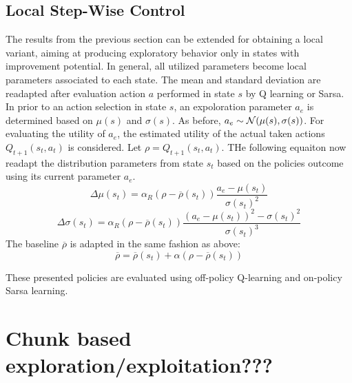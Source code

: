 \documentclass[10.5pt]{article}
\begin{document}
\subsection{Local Step-Wise Control}
The results from the previous section can be extended for obtaining a local variant, aiming at producing exploratory behavior only in states with improvement potential. In general, all utilized parameters become local parameters associated to each state. The mean and standard deviation are readapted after evaluation action $a$ performed in state $s$ by Q learning or Sarsa. In prior to an action selection in state $s$, an expoloration parameter $a_e$ is determined based on $\mu(s)$ and $\sigma(s)$. As before, $a_e\sim {\cal N}(\mu(s), \sigma(s))$. For evaluating the utility of $a_e$, the estimated utility of the actual taken actions $Q_{t+1}(s_t, a_t)$ is considered. Let $\rho = Q_{t+1}(s_t, a_t)$. THe following equaiton now readapt the distribution parameters from state $s_t$ based on the policies outcome using its current parameter $a_e$. 
\begin{equation}
\Delta\mu(s_t) = \alpha_R (\rho - \overline{\rho}(s_t)) \dfrac{a_e -\mu(s_t)}{\sigma(s_t)^2}
\end{equation} 
\begin{equation}
\Delta \sigma (s_t) = \alpha_R (\rho - \overline{\rho}(s_t))\dfrac{(a_e-\mu(s_t))^2-\sigma(s_t)^2}{\sigma(s_t)^3}
\end{equation}
The baseline $\overline{\rho}$ is adapted in the same fashion as above: 
\begin{equation}
\overline{\rho} = \overline{\rho}(s_t) + \alpha(\rho - \overline{\rho}(s_t))
\end{equation}

These presented policies are evaluated using off-policy Q-learning and on-policy Sarsa learning. 
\section{Chunk based exploration/exploitation???}
\end{document}
